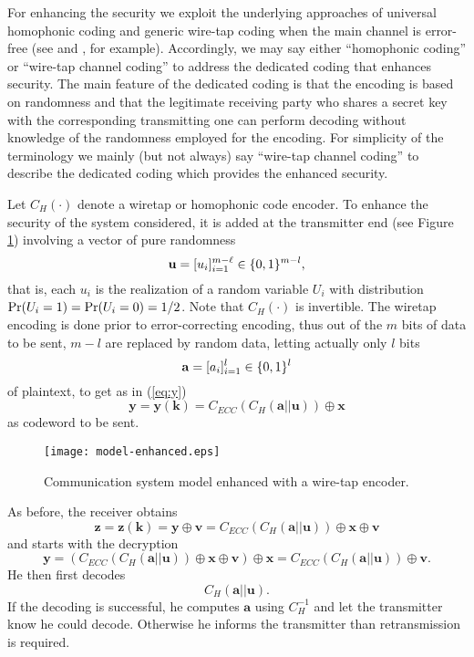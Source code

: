 \documentclass{article}[11pt]
\newcommand{\av}{\mathbf{a}}
\newcommand{\kv}{\mathbf{k}}
\newcommand{\uv}{\mathbf{u}}
\newcommand{\vv}{\mathbf{v}}
\newcommand{\xv}{\mathbf{x}}
\newcommand{\yv}{\mathbf{y}}
\newcommand{\zv}{\mathbf{z}}
\begin{document}
For enhancing the security we exploit the underlying approaches of
universal homophonic coding \cite{massey-1994} and generic
wire-tap coding when the main channel is error-free (see
\cite{wyner} and \cite{thangaraj-IEEE-IT-2007}, for example).
Accordingly, we may say either
``homophonic coding'' or ``wire-tap channel coding'' to address
the dedicated coding that enhances security. The
main feature of the dedicated coding is that the
encoding is based on randomness and that the
legitimate receiving party who shares a secret key with the
corresponding transmitting one can perform decoding without
knowledge of the randomness employed for the encoding. For
simplicity of the terminology we mainly (but not always) say
``wire-tap channel coding'' to describe the dedicated coding which
provides the enhanced security.

Let $C_H(\cdot)$ denote a wiretap or homophonic code encoder. To
enhance the security of the system considered, it is added at the
transmitter end (see Figure \ref{fig:figure-2}) involving a vector
of pure randomness
\[
{\bf u}=[u_i]_{i=1}^{m-\ell} \in \{0,1\}^{m-l},
\]
that is, each $u_i$ is the realization of a random variable $U_i$ with
distribution ${\rm Pr}(U_i=1) = {\rm Pr}(U_i=0)= 1/2$.
Note that $C_H(\cdot)$ is invertible.
The wiretap encoding is done prior to error-correcting encoding, thus
out of the $m$ bits of data to be sent, $m-l$ are replaced by random data,
letting actually only $l$ bits
\[
{\bf a}=[a_i]_{i=1}^l \in \{0,1\}^l
\]
of plaintext, to get as in (\ref{eq:y})
\begin{equation}\label{eq:ych}
\yv=\yv(\kv)=C_{ECC}(C_H(\av||\uv))\oplus \xv
\end{equation}
as codeword to be sent.
\begin{figure}\leavevmode
\begin{center}
\texttt{[image: model-enhanced.eps]}
\caption{Communication system model enhanced with a wire-tap encoder.}
\label{fig:figure-2}
\end{center}
\end{figure}
As before, the receiver obtains
\begin{equation}\label{eq:z}
\zv =\zv(\kv)=\yv \oplus \vv= C_{ECC}(C_H(\av||\uv))\oplus \xv\oplus \vv
\end{equation}
and starts with the decryption
\[
\yv=(C_{ECC}(C_H(\av||\uv))\oplus \xv \oplus \vv)\oplus \xv
=C_{ECC}(C_H(\av||\uv))\oplus \vv.
\]
He then first decodes
\[
C_H(\av||\uv).
\]
If the decoding is successful, he computes $\av$ using $C_H^{-1}$ and
let the transmitter know he could decode. Otherwise he informs the transmitter
than retransmission is required.
\end{document}
